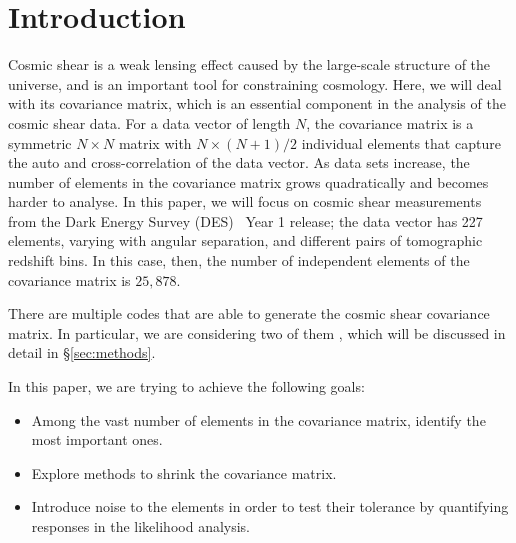 \documentclass[twocolumn]{\docclass}
\newcommand{\rsec}[1]{\S\ref{sec:#1}}
\begin{document}
	\dockeys{}
	
	\maketitlepost
	
	
	\section{Introduction}
	\label{sec:intro}
	
	Cosmic shear is a weak lensing effect caused by the large-scale structure of the universe, and is an important tool for constraining cosmology. Here, we will deal with its covariance matrix, which is an essential component in the analysis of the cosmic shear data. For a data vector of length $N$, the covariance matrix is a symmetric $N\times N$ matrix with $N\times (N+1)/2$ individual elements that capture the auto and cross-correlation of the data vector. As data sets increase, the number of elements in the covariance matrix grows quadratically and becomes harder to analyse. In this paper, we will focus on cosmic shear measurements from the Dark Energy Survey (DES)~\cite{Troxel:2017xyo} Year 1 release; the data vector has 227 elements, varying with angular separation, and different pairs of tomographic redshift bins. In this case, then, the number of independent elements of the covariance matrix is $25,878$. 
	
	There are multiple codes that are able to generate the cosmic shear covariance matrix. In particular, we are considering two of them \citep{Krause:2016jvl} \citep{Kohlinger:2017sxk}, which will be discussed in detail in \rsec{methods}.
	
	In this paper, we are trying to achieve the following goals: 
	\begin{itemize}	
	\item Among the vast number of elements in the covariance matrix, identify the most important ones. 	
	\item  Explore methods to shrink the covariance matrix. %
	\item  Introduce noise to the elements in order to test their tolerance by quantifying responses in the likelihood analysis.
	\end{itemize}
	
	
\end{document}
